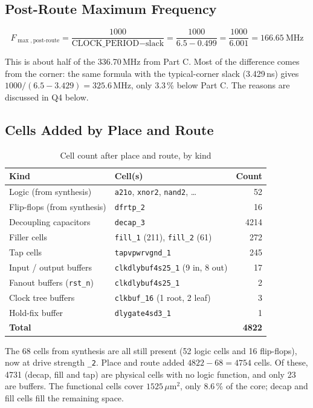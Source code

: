 \documentclass[11pt,a4paper]{article}
\begin{document}
\subsection{Post-Route Maximum Frequency}

\[
  F_{\max,\text{post-route}} = \frac{1000}{\text{CLOCK\_PERIOD} - \text{slack}}
  = \frac{1000}{6.5 - 0.499} = \frac{1000}{6.001} = 166.65\ \text{MHz}
\]

This is about half of the 336.70\,MHz from Part C. Most of the difference
comes from the corner: the same formula with the typical-corner slack
(3.429\,ns) gives $1000 / (6.5 - 3.429) = 325.6$\,MHz, only 3.3\,\% below
Part C. The reasons are discussed in Q4 below.

\subsection{Cells Added by Place and Route}

\begin{table}[H]
  \centering
  \begin{tabular}{llr}
    \toprule
    \textbf{Kind} & \textbf{Cell(s)} & \textbf{Count} \\
    \midrule
    Logic (from synthesis) & \texttt{a21o}, \texttt{xnor2}, \texttt{nand2}, \ldots & 52 \\
    Flip-flops (from synthesis) & \texttt{dfrtp\_2} & 16 \\
    \midrule
    Decoupling capacitors & \texttt{decap\_3} & 4214 \\
    Filler cells & \texttt{fill\_1} (211), \texttt{fill\_2} (61) & 272 \\
    Tap cells & \texttt{tapvpwrvgnd\_1} & 245 \\
    Input / output buffers & \texttt{clkdlybuf4s25\_1} (9 in, 8 out) & 17 \\
    Fanout buffers (\texttt{rst\_n}) & \texttt{clkdlybuf4s25\_1} & 2 \\
    Clock tree buffers & \texttt{clkbuf\_16} (1 root, 2 leaf) & 3 \\
    Hold-fix buffer & \texttt{dlygate4sd3\_1} & 1 \\
    \midrule
    \textbf{Total} & & \textbf{4822} \\
    \bottomrule
  \end{tabular}
  \caption{Cell count after place and route, by kind}
  \label{tab:partD_cells}
\end{table}

The 68 cells from synthesis are all still present (52 logic cells and 16
flip-flops), now at drive strength \texttt{\_2}. Place and route added
$4822 - 68 = 4754$ cells. Of these, 4731 (decap, fill and tap) are physical
cells with no logic function, and only 23 are buffers. The functional cells
cover $1525\,\mu$m$^2$, only 8.6\,\% of the core; decap and fill cells fill
the remaining space.
\end{document}
